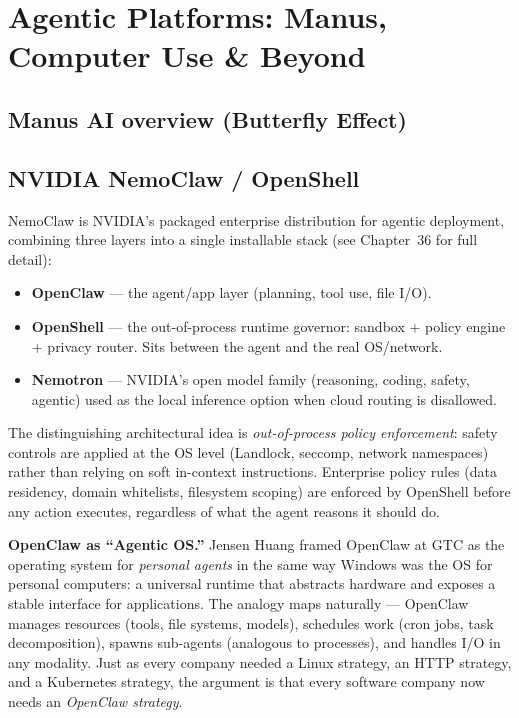 
\section{Agentic Platforms: Manus, Computer Use \& Beyond}

\subsection{Manus AI overview (Butterfly Effect)}


\subsection{NVIDIA NemoClaw / OpenShell}

NemoClaw is NVIDIA's packaged enterprise distribution for agentic deployment, combining
three layers into a single installable stack (see Chapter~36 for full detail):

\begin{itemize}
  \item \textbf{OpenClaw} --- the agent/app layer (planning, tool use, file I/O).
  \item \textbf{OpenShell} --- the out-of-process runtime governor: sandbox +
    policy engine + privacy router. Sits between the agent and the real OS/network.
  \item \textbf{Nemotron} --- NVIDIA's open model family (reasoning, coding, safety,
    agentic) used as the local inference option when cloud routing is disallowed.
\end{itemize}

The distinguishing architectural idea is \emph{out-of-process policy enforcement}:
safety controls are applied at the OS level (Landlock, seccomp, network namespaces)
rather than relying on soft in-context instructions. Enterprise policy rules
(data residency, domain whitelists, filesystem scoping) are enforced by OpenShell
before any action executes, regardless of what the agent reasons it should do.

\textbf{OpenClaw as ``Agentic OS.''} Jensen Huang framed OpenClaw at GTC as the
operating system for \emph{personal agents} in the same way Windows was the OS for
personal computers: a universal runtime that abstracts hardware and exposes a stable
interface for applications. The analogy maps naturally --- OpenClaw manages resources
(tools, file systems, models), schedules work (cron jobs, task decomposition), spawns
sub-agents (analogous to processes), and handles I/O in any modality. Just as every
company needed a Linux strategy, an HTTP strategy, and a Kubernetes strategy, the
argument is that every software company now needs an \emph{OpenClaw strategy}.

